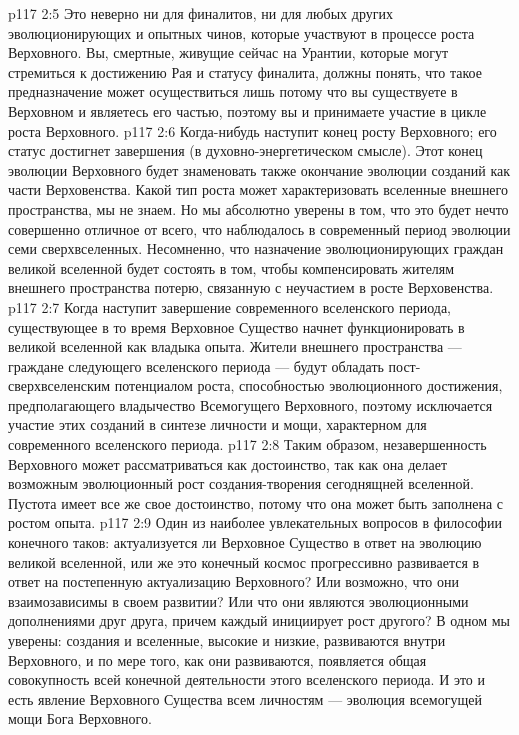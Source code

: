 \vs p117 2:5 Это неверно ни для финалитов, ни для любых других эволюционирующих и опытных чинов, которые участвуют в процессе роста Верховного. Вы, смертные, живущие сейчас на Урантии, которые могут стремиться к достижению Рая и статусу финалита, должны понять, что такое предназначение может осуществиться лишь потому что вы существуете в Верховном и являетесь его частью, поэтому вы и принимаете участие в цикле роста Верховного.
\vs p117 2:6 \pc Когда\hyp{}нибудь наступит конец росту Верховного; его статус достигнет завершения (в духовно\hyp{}энергетическом смысле). Этот конец эволюции Верховного будет знаменовать также окончание эволюции созданий как части Верховенства. Какой тип роста может характеризовать вселенные внешнего пространства, мы не знаем. Но мы абсолютно уверены в том, что это будет нечто совершенно отличное от всего, что наблюдалось в современный период эволюции семи сверхвселенных. Несомненно, что назначение эволюционирующих граждан великой вселенной будет состоять в том, чтобы компенсировать жителям внешнего пространства потерю, связанную с неучастием в росте Верховенства.
\vs p117 2:7 Когда наступит завершение современного вселенского периода, существующее в то время Верховное Существо начнет функционировать в великой вселенной как владыка опыта. Жители внешнего пространства --- граждане следующего вселенского периода --- будут обладать пост\hyp{}сверхвселенским потенциалом роста, способностью эволюционного достижения, предполагающего владычество Всемогущего Верховного, поэтому исключается участие этих созданий в синтезе личности и мощи, характерном для современного вселенского периода.
\vs p117 2:8 Таким образом, незавершенность Верховного может рассматриваться как достоинство, так как она делает возможным эволюционный рост создания\hyp{}творения сегоднящней вселенной. Пустота имеет все же свое достоинство, потому что она может быть заполнена с ростом опыта.
\vs p117 2:9 \pc Один из наиболее увлекательных вопросов в философии конечного таков: актуализуется ли Верховное Существо в ответ на эволюцию великой вселенной, или же это конечный космос прогрессивно развивается в ответ на постепенную актуализацию Верховного? Или возможно, что они взаимозависимы в своем развитии? Или что они являются эволюционными дополнениями друг друга, причем каждый инициирует рост другого? В одном мы уверены: создания и вселенные, высокие и низкие, развиваются внутри Верховного, и по мере того, как они развиваются, появляется общая совокупность всей конечной деятельности этого вселенского периода. И это и есть явление Верховного Существа всем личностям --- эволюция всемогущей мощи Бога Верховного.
